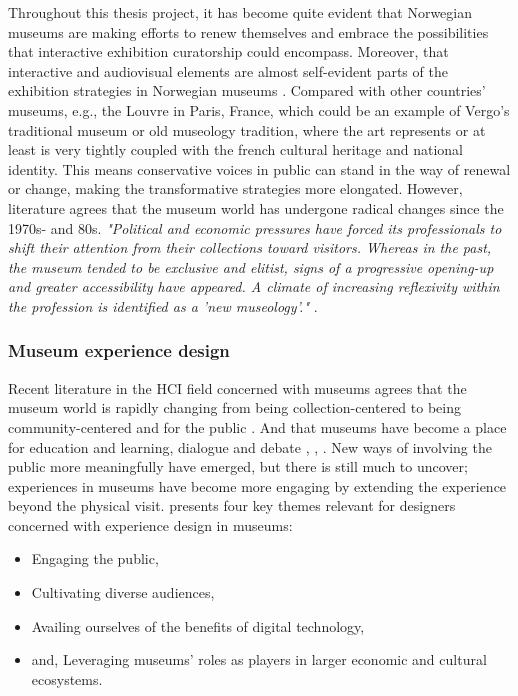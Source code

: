 Throughout this thesis project, it has become quite evident that Norwegian museums are making efforts to renew themselves and embrace the possibilities that interactive exhibition curatorship could encompass. Moreover, that interactive and audiovisual elements are almost self-evident parts of the exhibition strategies in Norwegian museums \autocite[p. 59]{melding23}. Compared with other countries' museums, e.g., the Louvre in Paris, France, which could be an example of Vergo's traditional museum or old museology tradition, where the art represents or at least is very tightly coupled with the french cultural heritage and national identity. This means conservative voices in public can stand in the way of renewal or change, making the transformative strategies more elongated. However, literature agrees that the museum world has undergone radical changes since the 1970s- and 80s. \emph{"Political and economic pressures have forced its professionals to shift their attention from their collections toward visitors. Whereas in the past, the museum tended to be exclusive and elitist, signs of a progressive opening-up and greater accessibility have appeared. A climate of increasing reflexivity within the profession is identified as a 'new museology'."} \autocite[p. 84]{ross_interpreting_2015}.


\subsubsection{Museum experience design}
Recent literature in the HCI field concerned with museums agrees that the museum world is rapidly changing from being collection-centered to being community-centered and for the public \autocite[p. 1]{vermeeren_museum_2018}. And that museums have become a place for education and learning, dialogue and debate \autocite{hein_1998}, \autocite{hooper_1994}, \autocite{Roberts_1997}. New ways of involving the public more meaningfully have emerged, but there is still much to uncover; experiences in museums have become more engaging by extending the experience beyond the physical visit. \autocite{vermeeren_museum_2018} presents four key themes relevant for designers concerned with experience design in museums:

\begin{itemize}
    \item Engaging the public,
    \item Cultivating diverse audiences,
    \item Availing ourselves of the benefits of digital technology,
    \item and, Leveraging museums’ roles as players in larger economic and cultural ecosystems.
\end{itemize}

